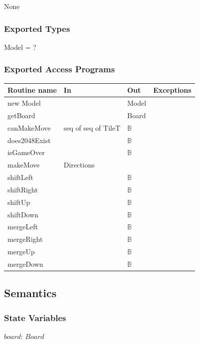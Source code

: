 \documentclass[12pt]{article}
\begin{document}
None

\subsubsection* {Exported Types}

Model = ?

\subsubsection* {Exported Access Programs}

\begin{tabular}{| l | l | l | p{5cm} |}
  \hline
  \textbf{Routine name} & \textbf{In} & \textbf{Out} & \textbf{Exceptions}\\
  \hline
  new Model & & Model & \\
  \hline
  getBoard & & Board & \\
  \hline
  canMakeMove & seq of seq of TileT & $\mathbb{B}$ & \\
  \hline
  does2048Exist & & $\mathbb{B}$ & \\
  \hline
  isGameOver & & $\mathbb{B}$ & \\
  \hline
  makeMove & Directions & & \\
  \hline
  shiftLeft & & $\mathbb{B}$ & \\
  \hline
  shiftRight & & $\mathbb{B}$ & \\
  \hline
  shiftUp & & $\mathbb{B}$ & \\
  \hline
  shiftDown & & $\mathbb{B}$ & \\
  \hline
  mergeLeft & & $\mathbb{B}$ & \\
  \hline
  mergeRight & & $\mathbb{B}$ & \\
  \hline
  mergeUp & & $\mathbb{B}$ & \\
  \hline
  mergeDown & & $\mathbb{B}$ & \\
  \hline
  
\end{tabular}

\subsection* {Semantics}

\subsubsection* {State Variables}

$\mathit{board}$: $Board$
\end{document}
